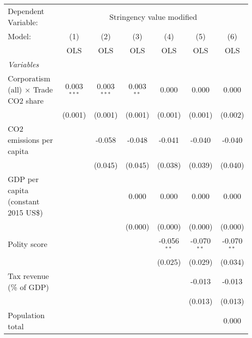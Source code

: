
\begingroup
\centering
\begin{tabular}{lcccccc}
   \toprule
   Dependent Variable: & \multicolumn{6}{c}{Stringency value modified}\\
   Model:                                      & (1)           & (2)           & (3)          & (4)           & (5)           & (6)\\  
                                               &  OLS          & OLS           & OLS          & OLS           & OLS           & OLS\\  
   \midrule
   \emph{Variables}\\
   Corporatism (all) $\times$ Trade CO2 share  & 0.003$^{***}$ & 0.003$^{***}$ & 0.003$^{**}$ & 0.000         & 0.000         & 0.000\\   
                                               & (0.001)       & (0.001)       & (0.001)      & (0.001)       & (0.001)       & (0.002)\\   
   CO2 emissions per capita                    &               & -0.058        & -0.048       & -0.041        & -0.040        & -0.040\\   
                                               &               & (0.045)       & (0.045)      & (0.038)       & (0.039)       & (0.040)\\   
   GDP per capita (constant 2015 US\$)         &               &               & 0.000        & 0.000         & 0.000         & 0.000\\   
                                               &               &               & (0.000)      & (0.000)       & (0.000)       & (0.000)\\   
   Polity score                                &               &               &              & -0.056$^{**}$ & -0.070$^{**}$ & -0.070$^{**}$\\   
                                               &               &               &              & (0.025)       & (0.029)       & (0.034)\\   
   Tax revenue (\% of GDP)                     &               &               &              &               & -0.013        & -0.013\\   
                                               &               &               &              &               & (0.013)       & (0.013)\\   
   Population total                            &               &               &              &               &               & 0.000\\   

\end{tabular}
